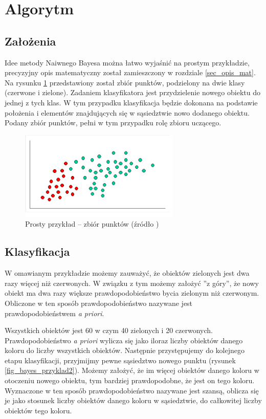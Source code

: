\section{Algorytm}
\label{sec_algorytm}

\subsection{Założenia}
\label{subsec_zalozenia}

Idee metody Naiwnego Bayesa można łatwo wyjaśnić na prostym przykładzie, precyzyjny opis matematyczny został zamieszczony w rozdziale \ref{sec_opis_mat}. Na rysunku \ref{fig_bayes_przyklad} przedstawiony został zbiór punktów, podzielony na dwie klasy (czerwone i zielone). Zadaniem klasyfikatora jest przydzielenie nowego obiektu do jednej z tych klas. W tym przypadku klasyfikacja będzie dokonana na podstawie położenia i elementów znajdujących się w sąsiedztwie nowo dodanego obiektu. Podany zbiór punktów, pełni w tym przypadku rolę zbioru uczącego.

\begin{figure}[!htb]
  \begin{center}
    \includegraphics[scale = 1]
    {img/bayes_przyklad.png}
  \end{center}
  \caption{Prosty przykład -- zbiór punktów (źródło \cite{bibPodrecznik})}
  \label{fig_bayes_przyklad}
\end{figure}

\subsection{Klasyfikacja}
\label{subsec_klasyfikacja}

W omawianym przykładzie możemy zauważyć, że obiektów zielonych jest dwa razy więcej niż czerwonych. W związku z tym możemy założyć ''z góry'', że nowy obiekt ma dwa razy większe prawdopodobieństwo bycia zielonym niż czerwonym. Obliczone w ten sposób prawdopodobieństwo nazywane jest prawdopodobieństwem \textit{a priori}. 

Wszystkich obiektów jest 60 w czym 40 zielonych i 20 czerwonych. Prawdopodobieństwo \textit{a priori} wylicza się jako iloraz liczby obiektów danego koloru do liczby wszystkich obiektów. Następnie przystępujemy do kolejnego etapu klasyfikacji, przyjmijmy pewne sąsiedztwo nowego punktu (rysunek \ref{fig_bayes_przyklad2}). Możemy założyć, że im więcej obiektów danego koloru w otoczeniu nowego obiektu, tym bardziej prawdopodobne, że jest on tego koloru. Wyznaczone w ten sposób prawdopodobieństwo nazywane jest szansą, oblicza się je jako stosunek liczby obiektów danego koloru w sąsiedztwie, do całkowitej liczby obiektów tego koloru.

